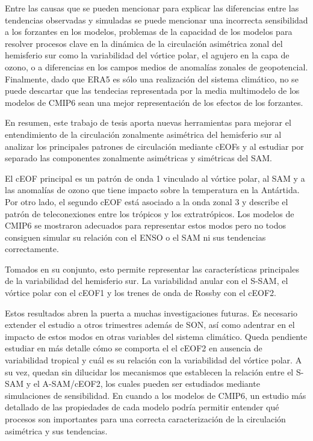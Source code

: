 \documentclass[12pt,oneside,a4paper]{reedthesis}
\begin{document}
Entre las causas que se pueden mencionar para explicar las diferencias entre las tendencias observadas y simuladas se puede mencionar una incorrecta sensibilidad a los forzantes en los modelos, problemas de la capacidad de los modelos para resolver procesos clave en la dinámica de la circulación asimétrica zonal del hemisferio sur como la variabilidad del vórtice polar, el agujero en la capa de ozono, o a diferencias en los campos medios de anomalías zonales de geopotencial.
Finalmente, dado que ERA5 es sólo una realización del sistema climático, no se puede descartar que las tendecias representada por la media multimodelo de los modelos de CMIP6 sean una mejor representación de los efectos de los forzantes.

En resumen, este trabajo de tesis aporta nuevas herramientas para mejorar el entendimiento de la circulación zonalmente asimétrica del hemisferio sur al analizar los principales patrones de circulación mediante cEOFs y al estudiar por separado las componentes zonalmente asimétricas y simétricas del SAM.

El cEOF principal es un patrón de onda 1 vinculado al vórtice polar, al SAM y a las anomalías de ozono que tiene impacto sobre la temperatura en la Antártida.
Por otro lado, el segundo cEOF está asociado a la onda zonal 3 y describe el patrón de teleconexiones entre los trópicos y los extratrópicos.
Los modelos de CMIP6 se mostraron adecuados para representar estos modos pero no todos consiguen simular su relación con el ENSO o el SAM ni sus tendencias correctamente.

Tomados en su conjunto, esto permite representar las características principales de la variabilidad del hemisferio sur.
La variabilidad anular con el S-SAM, el vórtice polar con el cEOF1 y los trenes de onda de Rossby con el cEOF2.

Estos resultados abren la puerta a muchas investigaciones futuras.
Es necesario extender el estudio a otros trimestres además de SON, así como adentrar en el impacto de estos modos en otras variables del sistema climático.
Queda pendiente estudiar en más detalle cómo se comporta el el cEOF2 en ausencia de variabilidad tropical y cuál es su relación con la variabilidad del vórtice polar.
A su vez, quedan sin dilucidar los mecanismos que establecen la relación entre el S-SAM y el A-SAM/cEOF2, los cuales pueden ser estudiados mediante simulaciones de sensibilidad.
En cuando a los modelos de CMIP6, un estudio más detallado de las propiedades de cada modelo podría permitir entender qué procesos son importantes para una correcta caracterización de la circulación asimétrica y sus tendencias.
\end{document}
